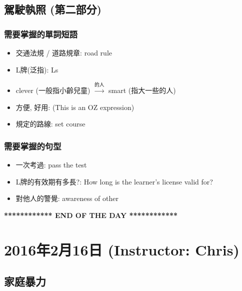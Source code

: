 \subsection{駕駛執照 (第二部分)}
\subsubsection*{需要掌握的單詞短語}
\begin{multicols}{2}
\begin{itemize}
  \itemsep0em
  \item 交通法規 / 道路規章: road rule
  \item L牌(泛指): Ls
  \item clever (一般指小齡兒童) $\xrightarrow{\text{的人}}$ smart (指大一些的人)
  \item 方便, 好用:  (This is an OZ expression)
  \item 規定的路線: set course
\end{itemize}
\end{multicols}

\subsubsection*{需要掌握的句型}
\begin{itemize}
  \itemsep0em
  \item 一次考過: pass the test 
  \item L牌的有效期有多長?: How long is the learner's license valid for?
  \item 對他人的警覺: awareness of other
\end{itemize}

\vspace{15mm}

\begin{center}
  \textbf{************ END OF THE DAY ************}
\end{center}
\newpage

\section{2016年2月16日 (Instructor: Chris)}
\subsection{家庭暴力}
